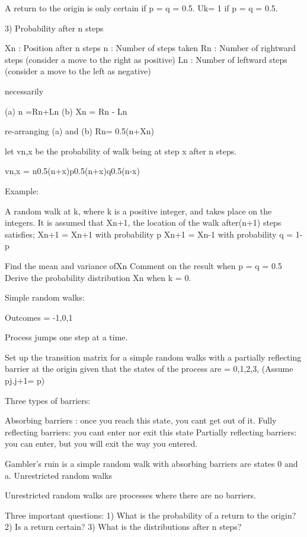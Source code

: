 A return to the origin is only certain if p = q = 0.5.
Uk= 1 if p = q = 0.5.

3) Probability after n steps

Xn : Position after n steps
n   : Number of steps taken
Rn : Number of rightward steps (consider a move to the right as positive)
Ln : Number of leftward steps (consider a move to the left as negative)

	necessarily
	
	 (a) n =Rn+Ln		 (b) Xn = Rn - Ln 

re-arranging (a) and (b)   Rn= 0.5(n+Xn) 

let vn,x be the probability of walk being at step x after n steps.

vn,x =  n0.5(n+x)p0.5(n+x)q0.5(n-x)


Example: 

A random walk at k, where k is a positive integer, and takes place on the integers. It is assumed that Xn+1, the location of the walk after(n+1) steps satisfies;
	Xn+1 = Xn+1 with probability p
	Xn+1 = Xn-1 with probability q = 1-p

Find the mean and variance ofXn
Comment on the result when p = q = 0.5
Derive the probability distribution Xn when k = 0.



Simple random walks: 

Outcomes ={ -1,0,1}

Process jumps one step at a time.

Set up the transition matrix for a simple random walks with a partially reflecting barrier at the origin given that the states of the 
process are ={ 0,1,2,3,} (Assume pj.j+1= p)

Three types of barriers:

Absorbing barriers : once you reach this state, you cant get out of it.
Fully reflecting barriers:  you cant enter nor exit this state
Partially reflecting barriers: you can enter, but you will exit the way you entered.

Gambler's ruin is a simple random walk with absorbing barriers are states 0 and a.
Unrestricted random walks

Unrestricted random walks are processes where there are no barriers.

Three important questions:
	1) What is the probability of a return to the origin?
	2) Is a return certain?
	3) What is the distributions after n steps?





